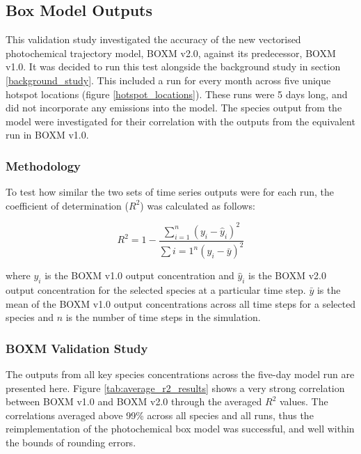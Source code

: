 \subsection{Box Model Outputs}
This validation study investigated the accuracy of the new vectorised photochemical trajectory model, BOXM v2.0, against its predecessor, BOXM v1.0. It was decided to run this test alongside the background study in section \ref{background_study}. This included a run for every month across five unique hotspot locations (figure \ref{hotspot_locations}). These runs were 5 days long, and did not incorporate any emissions into the model. The species output from the model were investigated for their correlation with the outputs from the equivalent run in BOXM v1.0.

\subsubsection{Methodology}
To test how similar the two sets of time series outputs were for each run, the coefficient of determination ($R^2$) was calculated as follows:

\begin{equation}
    R^2 = 1 - \frac{\sum_{i=1}^{n} (y_i - \hat{y}_i)^2}{\sum{i=1}^{n} (y_i - \bar{y})^2}
\end{equation}

where $y_i$ is the BOXM v1.0 output concentration and $\hat{y}_i$ is the BOXM v2.0 output concentration for the selected species at a particular time step. $\bar{y}$ is the mean of the BOXM v1.0 output concentrations across all time steps for a selected species and $n$ is the number of time steps in the simulation.

\subsubsection{BOXM Validation Study}
The outputs from all key species concentrations across the five-day model run are presented here. Figure \ref{tab:average_r2_results} shows a very strong correlation between BOXM v1.0 and BOXM v2.0 through the averaged $R^2$ values. The correlations averaged above 99\% across all species and all runs, thus the reimplementation of the photochemical box model was successful, and well within the bounds of rounding errors.

